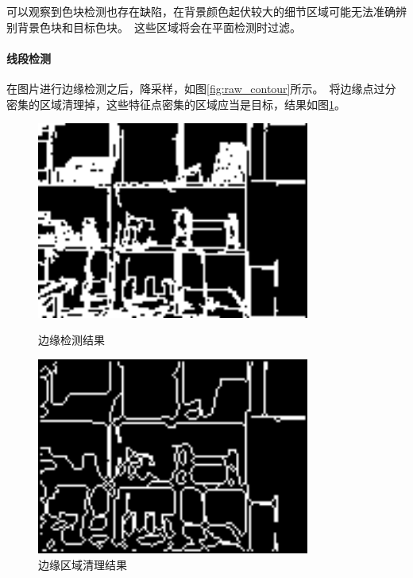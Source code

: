 可以观察到色块检测也存在缺陷，在背景颜色起伏较大的细节区域可能无法准确辨别背景色块和目标色块。\ 这些区域将会在平面检测时过滤。\ 

\paragraph{线段检测}

在图片进行边缘检测之后，降采样，如图\ref{fig:raw_contour}所示。\ 将边缘点过分密集的区域清理掉，这些特征点密集的区域应当是目标，结果如图\ref{fig:after_contour}。\ 	
\begin{figure}[H]
\begin{minipage}[t]{0.5\textwidth}
	\centering
    \includegraphics[width = 0.8\textwidth]{images/raw_contour.png}
    \caption{边缘检测结果}
    \label{fig:raw_contour}
\end{minipage}
\begin{minipage}[t]{0.5\textwidth}
	\centering
    \includegraphics[width = 0.8\textwidth]{images/after_contour.png}
    \caption{边缘区域清理结果}
    \label{fig:after_contour}
\end{minipage}
\end{figure}

